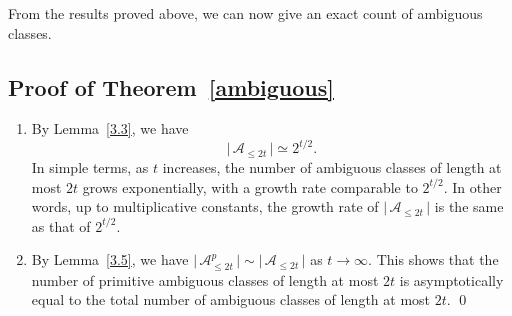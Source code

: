 \documentclass[a4paper,12pt]{amsart}
\numberwithin{equation}{section}
\theoremstyle{definition}
\newcommand{\thmref}[1]{Theorem~\ref{#1}}
\newcommand{\lemref}[1]{Lemma~\ref{#1}}
\numberwithin{equation}{section}
\begin{document}
\medskip From the results proved above, we can now give an exact count of ambiguous classes.
\subsection{Proof of \thmref{ambiguous}}
\begin{enumerate}
    \item By \lemref{3.3}, we have
\[
\lvert\,\mathscr A_{\le 2t}\,\rvert \simeq 2^{t/2}.
\]
In simple terms, as $t$ increases, the number of ambiguous classes of length at most $2t$ grows exponentially, with a growth rate comparable to $2^{t/2}$.
In other words, up to multiplicative constants, the growth rate of $\lvert\,\mathscr A_{\le 2t}\,\rvert$ is the same as that of $2^{t/2}$.

\item By \lemref{3.5}, we have
$\lvert\,\mathscr A^p_{\le 2t}\,\rvert \sim \lvert\,\mathscr A_{\le 2t}\,\rvert$ as  $t \to \infty$. 
This shows that the number of primitive ambiguous classes of length at most $2t$ is asymptotically equal
to the total number of ambiguous classes of length at most $2t$. \qed
\end{enumerate}

	{}
\end{document}
